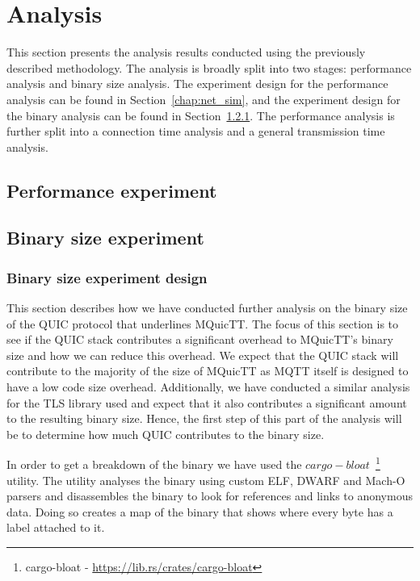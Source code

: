\chapter{Analysis} \label{chapter:eval}

This section presents the analysis results conducted using the previously described methodology.
The analysis is broadly split into two stages: performance analysis and binary size analysis.
The experiment design for the performance analysis can be found in Section~\ref{chap:net_sim}, and the experiment design for the binary analysis can be found in Section~\ref{sec:exp_bin}.
The performance analysis is further split into a connection time analysis and a general transmission time analysis.

\section{Performance experiment}




\newpage
\section{Binary size experiment}

\subsection{Binary size experiment design} \label{sec:exp_bin}

This section describes how we have conducted further analysis on the binary size of the QUIC protocol that underlines MQuicTT.
The focus of this section is to see if the QUIC stack contributes a significant overhead to MQuicTT's binary size and how we can reduce this overhead.
We expect that the QUIC stack will contribute to the majority of the size of MQuicTT as MQTT itself is designed to have a low code size overhead.
Additionally, we have conducted a similar analysis for the TLS library used and expect that it also contributes a significant amount to the resulting binary size.
Hence, the first step of this part of the analysis will be to determine how much QUIC contributes to the binary size.

In order to get a breakdown of the binary we have used the $cargo-bloat$~\footnote{cargo-bloat - \url{https://lib.rs/crates/cargo-bloat}} utility.
The utility analyses the binary using custom ELF, DWARF and Mach-O parsers and disassembles the binary to look for references and links to anonymous data.
Doing so creates a map of the binary that shows where every byte has a label attached to it.

